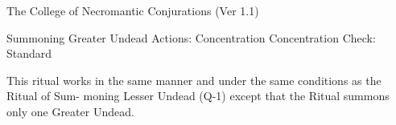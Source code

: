 \begin{Chapter}{The College of Necromantic Conjurations (Ver 1.1)}
\begin{ritual}[R-5]{Summoning Greater Undead }
Actions: Concentration 
Concentration Check: Standard 
\begin{effects}
 This  ritual  works  in  the  same  manner  and 
under  the  same  conditions  as  the  Ritual  of  Sum-
moning Lesser Undead (Q-1) except that the Ritual 
summons only one Greater Undead. 

\end{effects}
\end{ritual}

\end{Chapter}
